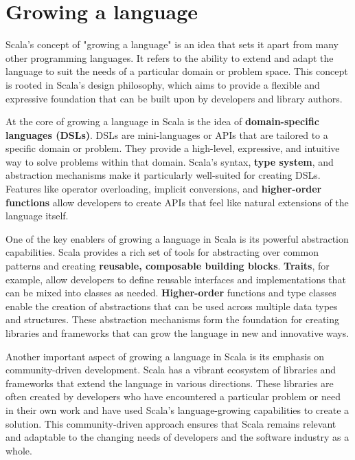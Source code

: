 \section{Growing a language}

Scala's concept of "growing a language" is an idea that sets it apart from many other programming languages. It refers to the ability to extend and adapt the language to suit the needs of a particular domain or problem space. This concept is rooted in Scala's design philosophy, which aims to provide a flexible and expressive foundation that can be built upon by developers and library authors.

At the core of growing a language in Scala is the idea of \textbf{domain-specific languages (DSLs)}. DSLs are mini-languages or APIs that are tailored to a specific domain or problem. They provide a high-level, expressive, and intuitive way to solve problems within that domain. Scala's syntax, \textbf{type system}, and abstraction mechanisms make it particularly well-suited for creating DSLs. Features like operator overloading, implicit conversions, and \textbf{higher-order functions} allow developers to create APIs that feel like natural extensions of the language itself. \footnotemark {}

One of the key enablers of growing a language in Scala is its powerful abstraction capabilities. Scala provides a rich set of tools for abstracting over common patterns and creating \textbf{reusable, composable building blocks}. \textbf{Traits}, for example, allow developers to define reusable interfaces and implementations that can be mixed into classes as needed. \textbf{Higher-order} functions and type classes enable the creation of abstractions that can be used across multiple data types and structures. These abstraction mechanisms form the foundation for creating libraries and frameworks that can grow the language in new and innovative ways.\footnotemark {}

Another important aspect of growing a language in Scala is its emphasis on community-driven development. Scala has a vibrant ecosystem of libraries and frameworks that extend the language in various directions. These libraries are often created by developers who have encountered a particular problem or need in their own work and have used Scala's language-growing capabilities to create a solution. This community-driven approach ensures that Scala remains relevant and adaptable to the changing needs of developers and the software industry as a whole.\footnotemark {}

